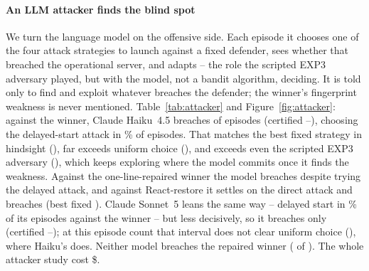 \documentclass[conference,compsoc]{IEEEtran}
\begin{document}
\paragraph{An LLM attacker finds the blind spot}
We turn the language model on the offensive side. Each episode it chooses one of the four
attack strategies to launch against a fixed defender, sees whether that breached the
operational server, and adapts -- the role the scripted EXP3 adversary played, but with
the model, not a bandit algorithm, deciding. It is told only to find and exploit whatever
breaches the defender; the winner's fingerprint weakness is never mentioned.
Table~\ref{tab:attacker} and Figure~\ref{fig:attacker}: against the winner, Claude
Haiku~4.5 breaches \AhChampBreach{} of \AhChampEps{} episodes (certified
\AhChampLo--\AhChampHi), choosing the delayed-start attack in \AhChampShare\% of
episodes. That matches the best fixed strategy in hindsight (\AhChampBest), far exceeds
uniform choice (\AhChampRand), and exceeds even the scripted EXP3 adversary
(\AhChampExpThree), which keeps exploring where the model commits once it finds the weakness.
Against the one-line-repaired winner the model breaches \AhFixBreach{} despite trying the
delayed attack, and against React-restore it settles on the direct attack and breaches
\AhRestoreBreach{} (best fixed \AhRestoreBest). Claude Sonnet~5 leans the same way --
delayed start in \AsChampShare\% of its \AsChampEps{} episodes against the winner -- but
less decisively, so it breaches only \AsChampBreach{} (certified \AsChampLo--\AsChampHi);
at this episode count that interval does not clear uniform choice (\AsChampRand), where
Haiku's does. Neither model breaches the repaired winner (\AsFixBreach{} of \AsFixEps).
The whole attacker study cost \$\AtkCost.
\end{document}
